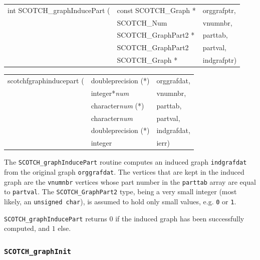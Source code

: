 \begin{itemize}
\progsyn

{\tt\begin{tabular}{l@{}ll}
int SCOTCH\_graphInducePart ( & const SCOTCH\_Graph * & orggrafptr, \\
                              & SCOTCH\_Num           & vnumnbr,    \\
                              & SCOTCH\_GraphPart2 *  & parttab,    \\
                              & SCOTCH\_GraphPart2    & partval,    \\
                              & SCOTCH\_Graph *       & indgrafptr)
\end{tabular}}

{\tt\begin{tabular}{l@{}ll}
scotchfgraphinducepart ( & doubleprecision (*)    & orggrafdat, \\
                         & integer*{\it num}      & vnumnbr,    \\
                         & character{\it num} (*) & parttab,    \\
                         & character{\it num}     & partval,    \\
                         & doubleprecision (*)    & indgrafdat, \\
                         & integer                & ierr)

\end{tabular}}

\progdes

The {\tt SCOTCH\_graphInducePart} routine computes an induced graph
\texttt{indgrafdat} from the original graph \texttt{orggrafdat}. The
vertices that are kept in the induced graph are the \texttt{vnumnbr}
vertices whose part number in the \texttt{parttab} array are equal to
\texttt{partval}. The \texttt{SCOTCH\_\lbt Graph\lbt Part2} type,
being a very small integer (most likely, an \texttt{unsigned char}),
is assumed to hold only small values, e.g. \texttt{0} or \texttt{1}.

\progret

{\tt SCOTCH\_graphInducePart} returns $0$ if the induced graph has
been successfully computed, and $1$ else.
\end{itemize}

\subsubsection{{\tt SCOTCH\_graphInit}}
\label{sec-lib-func-graphinit}

